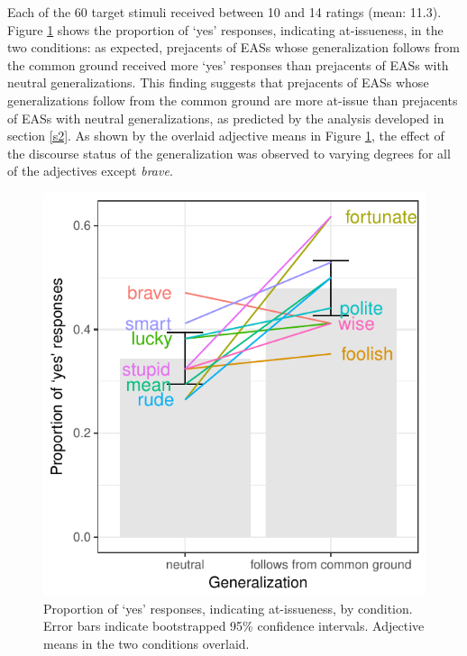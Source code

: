 \documentclass[11pt,fleqn]{article}
\newcommand{\6}{\mbox{$[\hspace*{-.6mm}[$}}
\newcommand{\9}{\mbox{$]\hspace*{-.6mm}]$}}
\begin{document}
Each of the 60 target stimuli received between 10 and 14 ratings (mean: 11.3).  Figure \ref{f-ai-by-adj} shows the proportion of `yes' responses, indicating at-issueness, in the two conditions:  as expected, prejacents of EASs whose generalization follows from the common ground  received more `yes' responses than prejacents of EASs with neutral generalizations. This finding suggests that prejacents of EASs whose generalizations follow from the common ground are more at-issue than prejacents of EASs with neutral generalizations, as predicted by the analysis developed in section \ref{s2}. As shown by the overlaid adjective means in Figure \ref{f-ai-by-adj}, the effect of the discourse status of the generalization was observed to varying degrees for all of the adjectives except {\em brave}.

\begin{figure}[H]
\begin{center}
\includegraphics[scale=.85]{../exp3-at-issueness/graphs/proportion-ai-by-condition}

\caption{Proportion of `yes' responses, indicating at-issueness, by condition. Error bars indicate bootstrapped 95\% confidence intervals. Adjective means in the two conditions overlaid.}\label{f-ai-by-adj}
\end{center}
\end{figure}
\end{document}
